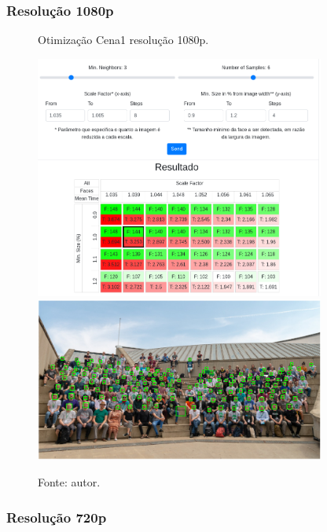 \subsubsection{Resolução 1080p} \label{sssec:resolution2}

\begin{figure}[H]
    \centering
    \caption[Otimização Cena1 resolução 1080p.]{Otimização Cena1 resolução 1080p.}
    \includegraphics[width=0.85\textwidth]{Cap4_Experimentos_Realizados/Figures/cena1_param_1080p_matriz.jpg}
    \includegraphics[width=0.85\textwidth]{Cap4_Experimentos_Realizados/Figures/cena1_param_1080p_faces.jpg}
    \caption*{Fonte: autor.}
    \label{fig:otimizacaoCena1_1080p}
\end{figure}

\subsubsection{Resolução 720p} \label{sssec:resolution3}

